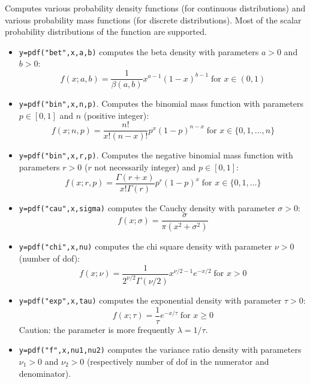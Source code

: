 \begin{mandescription}
  Computes various probability density functions (for continuous
  distributions) 
  and various probability mass functions (for discrete distributions). Most of the
  scalar probability distributions of the 
  function are supported. 
\begin{itemize}

\item {} \verb!y=pdf("bet",x,a,b)! computes the beta
  density with parameters $a > 0$ and $b > 0$:
$$
     f(x; a, b) =
        \frac{1}{\beta(a,b)} x^{a-1}(1-x)^{b-1} \;
        \mbox{for } x \in (0,1)
$$

\item {} \verb!y=pdf("bin",x,n,p)!. Computes
  the binomial mass function with parameters $p \in [0,1]$ and $n$
  (positive integer):
$$
     f(x; n, p) = \frac{ n! }{ x! (n-x)!} p^x (1-p)^{n-x} \;\mbox{for } x \in \{0,1,\dots,n\}
$$

\item {} \verb!y=pdf("bin",x,r,p)!. Computes
  the negative binomial mass function with parameters $r > 0$ ($r$ not
  necessarily integer) and $p \in [0,1]$:
$$
     f(x; r, p) = \frac{ \Gamma(r+x) }{ x! \Gamma(r)} p^r (1-p)^x \;\mbox{for } x \in \{0,1,\dots\}
$$


\item {} \verb!y=pdf("cau",x,sigma)! computes the Cauchy
  density with parameter $\sigma > 0$:
$$
     f(x; \sigma) = \frac{ \sigma }{ \pi ( x^2 + \sigma^2 ) }
$$


\item {} \verb!y=pdf("chi",x,nu)! computes the chi square
  density with parameter $\nu > 0$ (number of dof):
$$
     f(x; \nu) = \frac{1}{2^{\nu/2} \Gamma(\nu/2)} x^{\nu/2-1} e^{-x/2}\; \mbox{for } x > 0 
$$


\item {} \verb!y=pdf("exp",x,tau)! computes the exponential
  density with parameter $\tau > 0$:
$$
     f(x; \tau) = \frac{1}{\tau} e^{-x/\tau} \; \mbox{for } x
     \ge 0
$$
Caution: the parameter is more frequently $\lambda = 1/\tau$.


\item {} \verb!y=pdf("f",x,nu1,nu2)! computes
  the variance ratio density with parameters $\nu_1 > 0$ and $\nu_2 >
  0$ (respectively number of dof in the numerator and denominator).



\end{itemize}
\end{mandescription}
